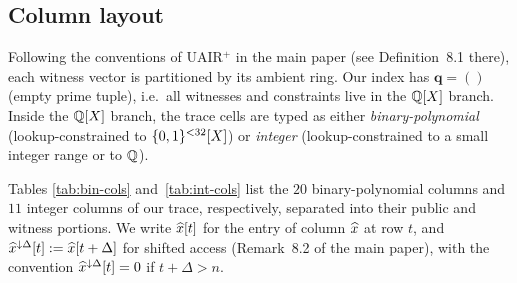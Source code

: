\subsection{Column layout}\label{sec:cols}

Following the conventions of UAIR$^+$ in the main paper (see
Definition~8.1 there), each witness vector is partitioned by its
ambient ring. Our index has $\mathbf{q} = ()$ (empty prime tuple),
i.e.\ all witnesses and constraints live in the $\mathbb{Q}[X]$ branch.
Inside the $\mathbb{Q}[X]$ branch, the trace cells are typed as either
\emph{binary-polynomial} (lookup-constrained to $\{0,1\}^{<32}[X]$) or
\emph{integer} (lookup-constrained to a small integer range or to
$\mathbb{Q}$).

Tables \ref{tab:bin-cols} and~\ref{tab:int-cols} list the $20$
binary-polynomial columns and $11$ integer columns of our trace,
respectively, separated into their public and witness portions. We
write $\widehat{x}[t]$ for the entry of column $\widehat{x}$ at row $t$,
and $\widehat{x}^{\downarrow\Delta}[t] := \widehat{x}[t+\Delta]$
for shifted access (Remark~8.2 of the main paper), with the convention
$\widehat{x}^{\downarrow\Delta}[t] = 0$ if $t+\Delta > n$.

